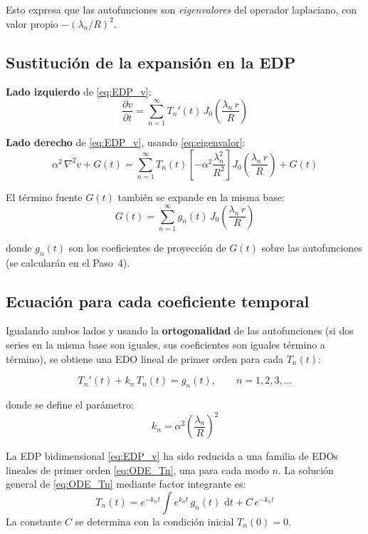 \documentclass[12pt, a4paper]{article}
\newenvironment{resultado}[1][]{%
  \begin{tcolorbox}[resultadoestilo, title={#1}]%
}{%
  \end{tcolorbox}%
}
\newcommand{\dd}{\,\mathrm{d}}
\newcommand{\pd}[2]{\dfrac{\partial #1}{\partial #2}}
\begin{document}
Esto expresa que las autofunciones son \emph{eigenvalores} del operador laplaciano,
con valor propio $-(\lambda_n/R)^2$.

\subsection{Sustitución de la expansión en la EDP}

\noindent\textbf{Lado izquierdo} de \eqref{eq:EDP_v}:
\begin{equation}
  \pd{v}{t} = \sum_{n=1}^{\infty} T_n'(t)\, J_0\!\left(\frac{\lambda_n\, r}{R}\right)
\end{equation}

\noindent\textbf{Lado derecho} de \eqref{eq:EDP_v}, usando \eqref{eq:eigenvalor}:
\begin{equation}
  \alpha^2\,\nabla^2 v + G(t)
  = \sum_{n=1}^{\infty} T_n(t)\left[-\alpha^2\frac{\lambda_n^2}{R^2}\right]
    J_0\!\left(\frac{\lambda_n\, r}{R}\right) + G(t)
\end{equation}

El término fuente $G(t)$ también se expande en la misma base:
\begin{equation}
  G(t) = \sum_{n=1}^{\infty} g_n(t)\, J_0\!\left(\frac{\lambda_n\, r}{R}\right)
  \label{eq:expansion_G}
\end{equation}

donde $g_n(t)$ son los coeficientes de proyección de $G(t)$ sobre las autofunciones
(se calcularán en el Paso~4).

\subsection{Ecuación para cada coeficiente temporal}

Igualando ambos lados y usando la \textbf{ortogonalidad} de las autofunciones
(si dos series en la misma base son iguales, sus coeficientes son iguales término a término),
se obtiene una EDO lineal de primer orden para cada $T_n(t)$:

\begin{equation}
  T_n'(t) + k_n\, T_n(t) = g_n(t), \qquad n = 1, 2, 3, \ldots
  \label{eq:ODE_Tn}
\end{equation}

donde se define el parámetro:
\begin{equation}
  k_n = \alpha^2\left(\frac{\lambda_n}{R}\right)^2
  \label{eq:kn}
\end{equation}

\begin{resultado}[Reducción a EDOs]
La EDP bidimensional \eqref{eq:EDP_v} ha sido reducida a una familia de EDOs
lineales de primer orden \eqref{eq:ODE_Tn}, una para cada modo $n$.
La solución general de \eqref{eq:ODE_Tn} mediante factor integrante es:
\begin{equation}
  T_n(t) = e^{-k_n t}\int e^{k_n t}\, g_n(t)\, \dd t + C\,e^{-k_n t}
  \label{eq:solucion_general_Tn}
\end{equation}
La constante $C$ se determina con la condición inicial $T_n(0) = 0$.
\end{resultado}
\end{document}
